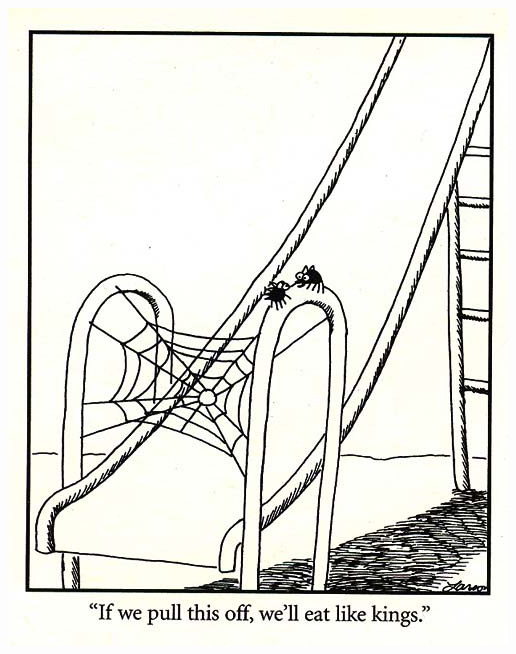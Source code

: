 \documentclass{beamer}
\begin{document}
\begin{frame}
 \center \includegraphics[scale=1.0]{assets/kings}
\end{frame}
\end{document}
